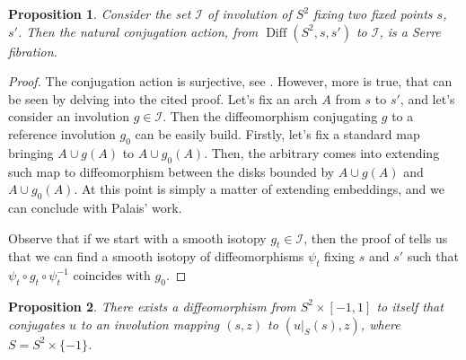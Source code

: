 \documentclass[a4paper, 11pt]{amsart}
\theoremstyle{plain}
\newtheorem{prop}{Proposition}[section]
\theoremstyle{definition}
\DeclareMathOperator{\Diff}{Diff}
\begin{document}
\begin{prop}\label{InvolutionsS2}
	Consider the set $\mathcal{I}$ of involution of $S^2$ fixing two fixed points $s$, $s'$. Then the natural conjugation action, from $\Diff(S^2, s, s')$ to $\mathcal{I}$, is a Serre fibration.
\end{prop}
\begin{proof}
	The conjugation action is surjective, see \cite[Thm.\ 1]{EilenbergSurlestransformationsperiodiques}. However, more is true, that can be seen by delving into the cited proof. Let's fix an arch $A$ from $s$ to $s'$, and let's consider an involution $g \in \mathcal{I}$. Then the diffeomorphism conjugating $g$ to a reference involution $g_0$ can be easily build. Firstly, let's fix a standard map bringing $A \cup g(A)$ to $A \cup g_0(A)$. Then, the arbitrary comes into extending such map to diffeomorphism between the disks bounded by $A \cup g(A)$ and $A \cup g_0(A)$. At this point is simply a matter of extending embeddings, and we can conclude with Palais' work.
	
	Observe that if we start with a smooth isotopy $g_t \in \mathcal{I}$, then the proof of  tells us that we can find a smooth isotopy of diffeomorphisms $\psi_t$ fixing $s$ and $s'$ such that $\psi_t \circ g_t \circ \psi_t^{-1}$ coincides with $g_0$.
\end{proof}
\begin{prop}\label{standardizedtomography}
	There exists a diffeomorphism from $S^2 \times [-1,1]$ to itself that conjugates $u$ to an involution mapping $(s,z)$ to $(u|_{S}(s), z)$, where $S = S^2 \times \{-1\}$.
\end{prop}
\end{document}
